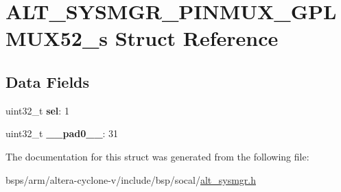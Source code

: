 \hypertarget{structALT__SYSMGR__PINMUX__GPLMUX52__s}{}\section{A\+L\+T\+\_\+\+S\+Y\+S\+M\+G\+R\+\_\+\+P\+I\+N\+M\+U\+X\+\_\+\+G\+P\+L\+M\+U\+X52\+\_\+s Struct Reference}
\label{structALT__SYSMGR__PINMUX__GPLMUX52__s}
\subsection*{Data Fields}
\begin{DoxyCompactItemize}
\item 
\mbox{\label{structALT__SYSMGR__PINMUX__GPLMUX52__s_aac42e995b457c659446141533360e870}} 
uint32\+\_\+t {\bfseries sel}\+: 1
\item 
\mbox{\label{structALT__SYSMGR__PINMUX__GPLMUX52__s_ad828677864b0e1cdd8427289b026b7c7}} 
uint32\+\_\+t {\bfseries \+\_\+\+\_\+pad0\+\_\+\+\_\+}\+: 31
\end{DoxyCompactItemize}


The documentation for this struct was generated from the following file\+:\begin{DoxyCompactItemize}
\item 
bsps/arm/altera-\/cyclone-\/v/include/bsp/socal/\mbox{\hyperlink{alt__sysmgr_8h}{alt\+\_\+sysmgr.\+h}}\end{DoxyCompactItemize}
